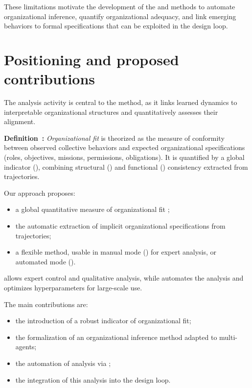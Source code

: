 These limitations motivate the development of the  and  methods to automate organizational inference, quantify organizational adequacy, and link emerging behaviors to formal specifications that can be exploited in the design loop.



\section{Positioning and proposed contributions}
The analysis activity is central to the  method, as it links learned dynamics to interpretable organizational structures and quantitatively assesses their alignment.

\textbf{Definition~:} \textit{Organizational fit} is theorized as the measure of conformity between observed collective behaviors and expected organizational specifications (roles, objectives, missions, permissions, obligations). It is quantified by a global indicator (\textbf{}), combining structural () and functional () consistency extracted from trajectories.

Our approach proposes:
\begin{itemize}
  \item a global quantitative measure of organizational fit ;
  \item the automatic extraction of implicit organizational specifications from trajectories;
  \item a flexible method, usable in manual mode () for expert analysis, or automated mode ().
\end{itemize}

 allows expert control and qualitative analysis, while \textbf{} automates the analysis and optimizes hyperparameters for large-scale use.

The main contributions are:
\begin{itemize}
  \item the introduction of a robust indicator of organizational fit;
  \item the formalization of an organizational inference method adapted to multi-agents;
  \item the automation of analysis via ;
  \item the integration of this analysis into the  design loop.
\end{itemize}

